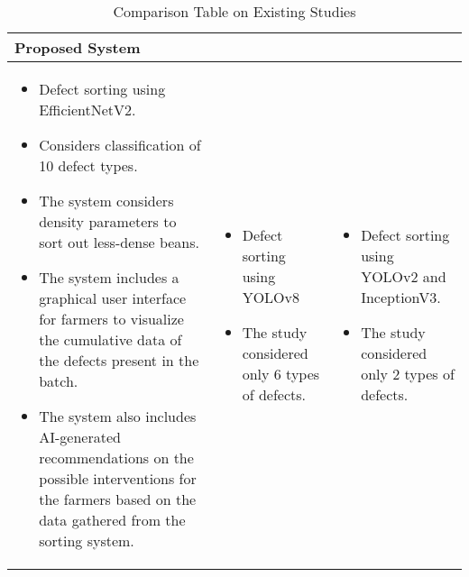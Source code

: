 \begin{center}
	\scriptsize{
    \begin{longtable}{| p{5cm} | p{4cm} | p{4cm} |}
	\caption{Comparison Table on Existing Studies} 	
	\label{comparison_table_existing_studies}
	\endfirsthead
	\endhead
    \hline
    Proposed System & \cite{Balay_Cabrera_Jensen_Mayuga_2024} & \cite{Lualhati_Mariano_Torres_Fenol_2022} \\ \hline
    
	\begin{itemize}
		\item Defect sorting using EfficientNetV2. 

		\item Considers classification of 10 defect types. 
	
		\item The system considers density parameters to sort out less-dense beans. 
	
		\item The system includes a graphical user interface for farmers to visualize the cumulative data of the defects present in the batch. 
	
		\item The system also includes AI-generated recommendations on the possible interventions for the farmers based on the data gathered from the sorting system.  
	\end{itemize}
	&
	\begin{itemize}
		\item Defect sorting using YOLOv8 

		\item The study considered only 6 types of defects. 
	\end{itemize}
	&
	\begin{itemize}
		\item Defect sorting using YOLOv2 and InceptionV3. 

		\item The study considered only 2 types of defects. 
	\end{itemize}
	\\
	\hline
    \end{longtable}
	}
\end{center}

